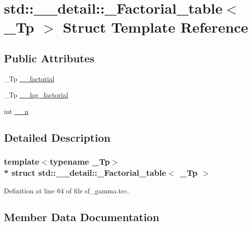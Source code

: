 \hypertarget{structstd_1_1____detail_1_1__Factorial__table}{}\section{std\+:\+:\+\_\+\+\_\+detail\+:\+:\+\_\+\+Factorial\+\_\+table$<$ \+\_\+\+Tp $>$ Struct Template Reference}
\label{structstd_1_1____detail_1_1__Factorial__table}
\subsection*{Public Attributes}
\begin{DoxyCompactItemize}
\item 
\+\_\+\+Tp \hyperlink{structstd_1_1____detail_1_1__Factorial__table_a4e8d20f3fa301037b097bb9f8e5f2060}{\+\_\+\+\_\+factorial}
\item 
\+\_\+\+Tp \hyperlink{structstd_1_1____detail_1_1__Factorial__table_a9d4b412d4d8b46ec660b0441516f412c}{\+\_\+\+\_\+log\+\_\+factorial}
\item 
int \hyperlink{structstd_1_1____detail_1_1__Factorial__table_a08dfe7484fca4bcdd1969ce2fa73edc6}{\+\_\+\+\_\+n}
\end{DoxyCompactItemize}


\subsection{Detailed Description}
\subsubsection*{template$<$typename \+\_\+\+Tp$>$\\*
struct std\+::\+\_\+\+\_\+detail\+::\+\_\+\+Factorial\+\_\+table$<$ \+\_\+\+Tp $>$}



Definition at line 64 of file sf\+\_\+gamma.\+tcc.



\subsection{Member Data Documentation}
